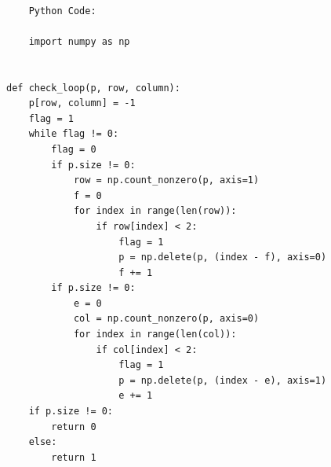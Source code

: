 \documentclass[12pt, letterpaper, twoside]{book}
\begin{document}
\begin{lstlisting}

	Python Code:
	
	import numpy as np


def check_loop(p, row, column):
    p[row, column] = -1
    flag = 1
    while flag != 0:
        flag = 0
        if p.size != 0:
            row = np.count_nonzero(p, axis=1)
            f = 0
            for index in range(len(row)):
                if row[index] < 2:
                    flag = 1
                    p = np.delete(p, (index - f), axis=0)
                    f += 1
        if p.size != 0:
            e = 0
            col = np.count_nonzero(p, axis=0)
            for index in range(len(col)):
                if col[index] < 2:
                    flag = 1
                    p = np.delete(p, (index - e), axis=1)
                    e += 1
    if p.size != 0:
        return 0
    else:
        return 1



\end{lstlisting}
\end{document}
